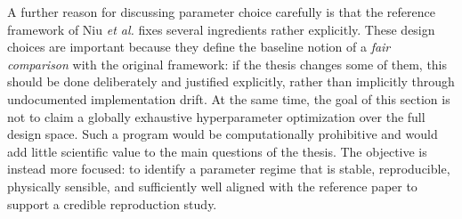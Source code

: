 A further reason for discussing parameter choice carefully is that the reference framework of Niu \emph{et al.} fixes several ingredients rather explicitly. 
These design choices are important because they define the baseline notion of a \emph{fair comparison} with the original framework: if the thesis changes some of them, this should be done deliberately and justified explicitly, rather than implicitly through undocumented implementation drift.
At the same time, the goal of this section is not to claim a globally exhaustive hyperparameter optimization over the full design space. Such a program would be computationally prohibitive and would add little scientific value to the main questions of the thesis. The objective is instead more focused: to identify a parameter regime that is stable, reproducible, physically sensible, and sufficiently well aligned with the reference paper to support a credible reproduction study. 

